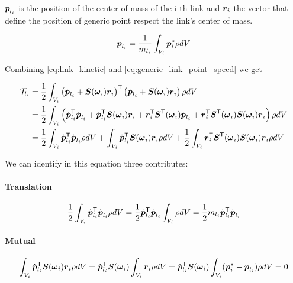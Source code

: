 $\boldsymbol{p}_{l_i}$ is the position of the center of mass of the i-th link and $\boldsymbol{r}_i$ the vector that define the position of generic point respect the link's center of mass.

\begin{equation}
    \boldsymbol{p}_{l_i} = \frac{1}{m_{l_i}} \int_{V_i} \boldsymbol{p}_i^* \rho dV \label{eq:center_mass}
\end{equation}

Combining \autoref{eq:link_kinetic} and \autoref{eq:generic_link_point_speed} we get

\begin{align*}
	\mathcal{T}_{l_i} &= \frac{1}{2} \int_{V_i}
	\left(\dot{\boldsymbol{p}}_{l_i} +\boldsymbol{S}(\boldsymbol{\omega}_i) \boldsymbol{r}_i\right)^{\mathsf{T}}
	\left(\dot{\boldsymbol{p}}_{l_i} + \boldsymbol{S}(\boldsymbol{\omega}_i) \boldsymbol{r}_i\right) \rho dV \\
	&= \frac{1}{2} \int_{V_i} \left(
	\dot{\boldsymbol{p}}_{l_i}^{\mathsf{T}} \dot{\boldsymbol{p}}_{l_i} +
	\dot{\boldsymbol{p}}_{l_i}^{\mathsf{T}} \boldsymbol{S}(\boldsymbol{\omega}_i) \boldsymbol{r}_i +
	\boldsymbol{r}_i^{\mathsf{T}} \boldsymbol{S}^{\mathsf{T}}(\boldsymbol{\omega}_i)  \dot{\boldsymbol{p}}_{l_i} +
	\boldsymbol{r}_i^{\mathsf{T}} \boldsymbol{S}^{\mathsf{T}}(\boldsymbol{\omega}_i) \boldsymbol{S}(\boldsymbol{\omega}_i) \boldsymbol{r}_i
	\right) \rho dV \\
	&=
	\frac{1}{2} \int_{V_i} \dot{\boldsymbol{p}}_{l_i}^{\mathsf{T}} \dot{\boldsymbol{p}}_{l_i} \rho dV +
	\int_{V_i} \dot{\boldsymbol{p}}_{l_i}^{\mathsf{T}} \boldsymbol{S}(\boldsymbol{\omega}_i) \boldsymbol{r}_i \rho dV +
	\frac{1}{2} \int_{V_i} \boldsymbol{r}_i^{\mathsf{T}} \boldsymbol{S}^{\mathsf{T}}(\boldsymbol{\omega}_i) \boldsymbol{S}(\boldsymbol{\omega}_i) \boldsymbol{r}_i \rho dV
\end{align*}

We can identify in this equation three contributes:

\paragraph{Translation}

\[
	\frac{1}{2} \int_{V_i} \dot{\boldsymbol{p}}_{l_i}^{\mathsf{T}} \dot{\boldsymbol{p}}_{l_i} \rho dV =
	\frac{1}{2} \dot{\boldsymbol{p}}_{l_i}^{\mathsf{T}} \dot{\boldsymbol{p}}_{l_i} \int_{V_i} \rho dV =
	\frac{1}{2} m_{l_i} \dot{\boldsymbol{p}}_{l_i}^{\mathsf{T}} \dot{\boldsymbol{p}}_{l_i}
\]

\paragraph{Mutual}

\[
	\int_{V_i} \dot{\boldsymbol{p}}_{l_i}^{\mathsf{T}} \boldsymbol{S}(\boldsymbol{\omega}_i) \boldsymbol{r}_i \rho dV =
	\dot{\boldsymbol{p}}_{l_i}^{\mathsf{T}} \boldsymbol{S}(\boldsymbol{\omega}_i) \int_{V_i} \boldsymbol{r}_i \rho dV =
	\dot{\boldsymbol{p}}_{l_i}^{\mathsf{T}} \boldsymbol{S}(\boldsymbol{\omega}_i) \int_{V_i} (\boldsymbol{p}_i^* - \boldsymbol{p}_{l_i}) \rho dV = 0
\]

